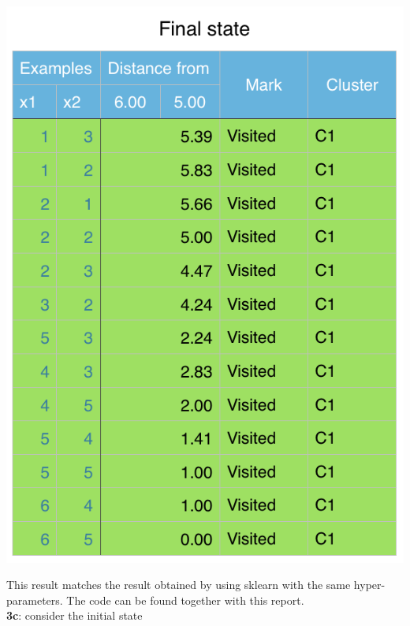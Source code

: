 \documentclass[11pt]{article}
\begin{document}
\begin{center}
\includegraphics[scale=0.57]{dbscan-final.png}
\end{center}

This result matches the result obtained by using sklearn with the same hyper-parameters. The code can be found together with this report.\\

\textbf{3c}: consider the initial state
\end{document}
